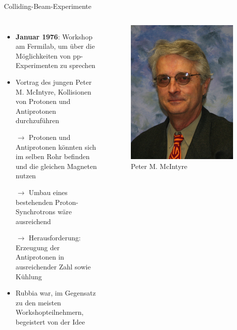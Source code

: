 \documentclass[aspectratio=1610, professionalfonts, 10pt]{beamer}
\begin{document}
\begin{frame}{Colliding-Beam-Experimente}
	\begin{columns}
				\begin{itemize}
					\setlength\itemsep{0.5em}
					\item \textbf{Januar 1976}: Workshop am Fermilab, um über die Möglichkeiten von pp-Experimenten zu sprechen
					\item Vortrag des jungen Peter M. McIntyre, Kollisionen von Protonen und Antiprotonen durchzuführen
					\item[$\rightarrow$] Protonen und Antiprotonen könnten sich im selben Rohr befinden und die gleichen Magneten nutzen
					\item[$\rightarrow$] Umbau eines bestehenden Proton-Synchrotrons wäre ausreichend
					\item[$\rightarrow$] Herausforderung: Erzeugung der Antiprotonen in ausreichender Zahl sowie Kühlung
					\item Rubbia war, im Gegensatz zu den meisten Workshopteilnehmern, begeistert von der Idee
				\end{itemize}
			\begin{figure}
	  			\centering
				\includegraphics[width=0.8\linewidth]{Images/mcintyre.jpg}
				\caption{Peter M. McIntyre \cite{mci}}
	  			\label{fig:sad}
			\end{figure}

	\end{columns}
\end{frame}
\end{document}
